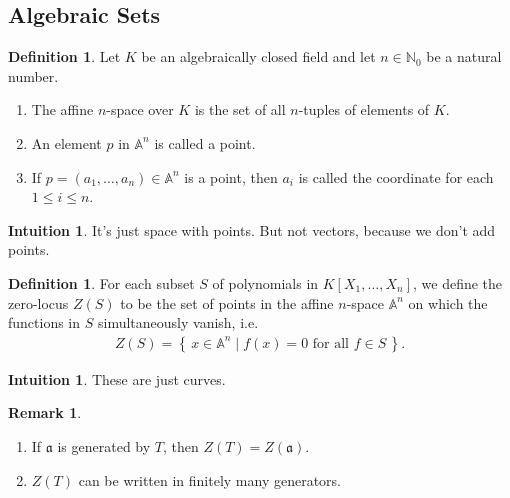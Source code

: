 \documentclass[11pt]{book}
\theoremstyle{definition}
\newtheorem{definition}[theorem]{Definition}
\newtheorem{remark}[theorem]{Remark}
\newtheorem{intuition}[theorem]{Intuition}
\numberwithin{equation}{section}
\newcommand{\makeset}[2]{\left\{\, #1 \mathrel{\mid} #2 \,\right\}}
\begin{document}
\subsection*{Algebraic Sets}
\begin{defbox}
    \begin{definition}
        Let \(K\) be an algebraically closed field and let \(n \in \mathbb{N}_0\) be a natural number.
        \begin{enumerate}
            \item The affine \(n\)-space over \(K\) is the set of all \(n\)-tuples of elements of \(K\).
            \item An element \(p\) in \(\mathbb{A}^n\) is called a point.
            \item If \(p = (a_1, \ldots, a_n) \in \mathbb{A}^n\) is a point, then \(a_i\) is called the coordinate for each \(1 \leq i \leq n\).
        \end{enumerate}
    \end{definition}
\end{defbox}

\begin{intbox}
\begin{intuition}
It's just space with points. But not vectors, because we don't add points.
\end{intuition}
\end{intbox}

\begin{defbox}
    \begin{definition}
        For each subset \(S\) of polynomials in \(K[X_1, \ldots, X_n]\), we define the zero-locus \(Z(S)\) to be the set of points in the affine \(n\)-space \(\mathbb{A}^n\) on which the functions in \(S\) simultaneously vanish, i.e.
        \begin{align*}
            Z(S) = \makeset{x \in \mathbb{A}^n}{f(x) = 0 \text{ for all } f \in S} \text{.}
        \end{align*}
    \end{definition}
\end{defbox}

\begin{intbox}
    \begin{intuition}
        These are just curves.
    \end{intuition}
\end{intbox}

\begin{rembox}
\begin{remark}
    \begin{enumerate}
        \item If \(\mathfrak{a}\) is generated by \(T\), then \(Z(T) = Z(\mathfrak{a})\).
        \item \(Z(T)\) can be written in finitely many generators.
    \end{enumerate}
\end{remark}
\end{rembox}
\end{document}
